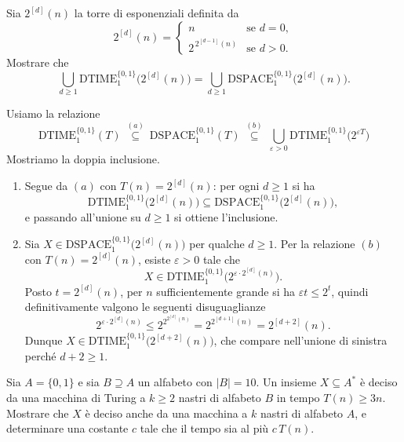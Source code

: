 \newpage

\begin{ex}
Sia $2^{[d]}(n)$ la torre di esponenziali definita da
\[
2^{[d]}(n)=
\begin{cases}
n & \text{se } d=0,\\[2pt]
2^{\,2^{[d-1]}(n)} & \text{se } d>0.
\end{cases}
\]
Mostrare che
\[
\bigcup_{d\ge1}\mathrm{DTIME}_1^{\{0,1\}}\big(2^{[d]}(n)\big)=\bigcup_{d\ge1}\mathrm{DSPACE}_1^{\{0,1\}}\big(2^{[d]}(n)\big).
\]
\end{ex}

\begin{sol}
Usiamo la relazione
\[
\mathrm{DTIME}_1^{\{0,1\}}(T)\ \overset{(a)}{\subseteq}\ \mathrm{DSPACE}_1^{\{0,1\}}(T)\ \overset{(b)}{\subseteq}\ \bigcup_{\varepsilon>0}\mathrm{DTIME}_1^{\{0,1\}}\big(2^{\varepsilon T}\big)
\]
Mostriamo la doppia inclusione.
\begin{enumerate}
\item[``$\subseteq$''] Segue da $(a)$ con $T(n)=2^{[d]}(n)$: per ogni $d\ge1$ si ha
\[
\mathrm{DTIME}_1^{\{0,1\}}\big(2^{[d]}(n)\big)\subseteq\mathrm{DSPACE}_1^{\{0,1\}}\big(2^{[d]}(n)\big),
\]
e passando all'unione su $d\ge1$ si ottiene l'inclusione.
\item[``$\supseteq$''] Sia $X\in\mathrm{DSPACE}_1^{\{0,1\}}\big(2^{[d]}(n)\big)$ per qualche $d\ge1$. Per la relazione $(b)$ con $T(n)=2^{[d]}(n)$, esiste $\varepsilon>0$ tale che
\[
X\in\mathrm{DTIME}_1^{\{0,1\}}\big(2^{\varepsilon\cdot2^{[d]}(n)}\big).
\]
Posto $t=2^{[d]}(n)$, 
per $n$ sufficientemente grande si ha 
$\varepsilon t\le 2^t$, quindi definitivamente valgono
le seguenti disuguaglianze
\[
2^{\varepsilon\cdot2^{[d]}(n)}\le 
2^{2^{2^{[d]}(n)}} =
2^{2^{[d+1]}(n)}
=2^{[d+2]}(n).
\]
Dunque $X\in\mathrm{DTIME}_1^{\{0,1\}}
\big(2^{[d+2]}(n)\big)$, 
che compare nell'unione di sinistra perché 
$d+2\ge1$.
\end{enumerate}
\end{sol}



\newpage

\begin{ex}
Sia $A=\{0,1\}$ e sia $B\supseteq A$ un alfabeto con $|B|=10$. Un insieme $X\subseteq A^*$ è deciso da una macchina di Turing a $k\geq 2$ nastri di alfabeto $B$ in tempo $T(n)\geq 3n$. Mostrare che $X$ è deciso anche da una macchina a $k$ nastri di alfabeto $A$, e determinare una costante $c$ tale che il tempo sia al più $c\,T(n)$.
\end{ex}

